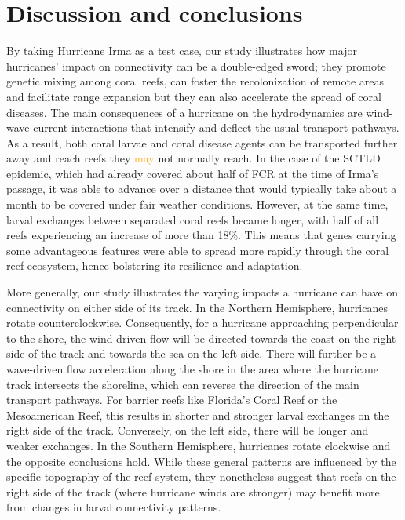 \documentclass[fleqn,10pt]{wlscirep}
\newcommand{\modif}[1]{\textcolor{orange}{#1}}
\begin{document}
\section{Discussion and conclusions}

By taking Hurricane Irma as a test case, our study illustrates how major hurricanes' impact on connectivity can be a double-edged sword; they promote genetic mixing among coral reefs, can foster the recolonization of remote areas and facilitate range expansion but they can also accelerate the spread of coral diseases. The main consequences of a hurricane on the hydrodynamics are wind-wave-current interactions that intensify and deflect the usual transport pathways. As a result, both coral larvae and coral disease agents can be transported further away and reach reefs they \modif{may} not normally reach. In the case of the SCTLD epidemic, which had already covered about half of FCR at the time of Irma's passage, it was able to advance over a distance that would typically take about a month to be covered under fair weather conditions. However, at the same time, larval exchanges between separated coral reefs became longer, with half of all reefs experiencing an increase of more than 18\%. This means that genes carrying some advantageous features were able to spread more rapidly through the coral reef ecosystem, hence bolstering its resilience and adaptation.

More generally, our study illustrates the varying impacts a hurricane can have on connectivity on either side of its track. In the Northern Hemisphere, hurricanes rotate counterclockwise. Consequently, for a hurricane approaching perpendicular to the shore, the wind-driven flow will be directed towards the coast on the right side of the track and towards the sea on the left side. There will further be a wave-driven flow acceleration along the shore in the area where the hurricane track intersects the shoreline, which can reverse the direction of the main transport pathways. For barrier reefs like Florida's Coral Reef or the Mesoamerican Reef, this results in shorter and stronger larval exchanges on the right side of the track. Conversely, on the left side, there will be longer and weaker exchanges. In the Southern Hemisphere, hurricanes rotate clockwise and the opposite conclusions hold. While these general patterns are influenced by the specific topography of the reef system, they nonetheless suggest that reefs on the right side of the track (where hurricane winds are stronger) may benefit more from changes in larval connectivity patterns.
\end{document}
